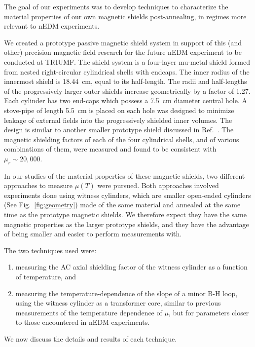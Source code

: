 \documentclass[review]{elsarticle}
\begin{document}
The goal of our experiments was to develop techniques to characterize
the material properties of our own magnetic shields post-annealing, in
regimes more relevant to nEDM experiments.


We created a prototype passive magnetic shield system in support of
this (and other) precision magnetic field research for the future nEDM
experiment to be conducted at TRIUMF.  The shield system is a
four-layer mu-metal shield formed from nested right-circular
cylindrical shells with endcaps.  The inner radius of the innermost
shield is 18.44~cm, equal to its half-length. The radii and
half-lengths of the progressively larger outer shields increase
geometrically by a factor of 1.27.  Each cylinder has two end-caps
which possess a 7.5~cm diameter central hole.  A stove-pipe of length
5.5~cm is placed on each hole was designed to minimize leakage of
external fields into the progressively shielded inner volumes.  The
design is similar to another smaller prototype shield discussed in
Ref.~\cite{bib:nmorpaper}.  The magnetic shielding factors of each of
the four cylindrical shells, and of various combinations of them, were
measured and found to be consistent with $\mu_r\sim 20,000$.

In our studies of the material properties of these magnetic shields,
two different approaches to measure $\mu(T)$ were pursued.  Both
approaches involved experiments done using witness cylinders, which
are smaller open-ended cylinders (See Fig.~\ref{fig:geometry}) made of
the same material and annealed at the same time as the prototype
magnetic shields.  We therefore expect they have the same magnetic
properties as the larger prototype shields, and they have the
advantage of being smaller and easier to perform measurements with.



The two techniques used were:
\begin{enumerate}
\item measuring the AC axial shielding factor of the witness cylinder
  as a function of temperature, and
\item measuring the temperature-dependence of the slope of a minor B-H
  loop, using the witness cylinder as a transformer core, similar to
  previous measurements of the temperature dependence of $\mu$, but
  for parameters closer to those encountered in nEDM experiments.
\end{enumerate}
We now discuss the details and results of each technique.
\end{document}
